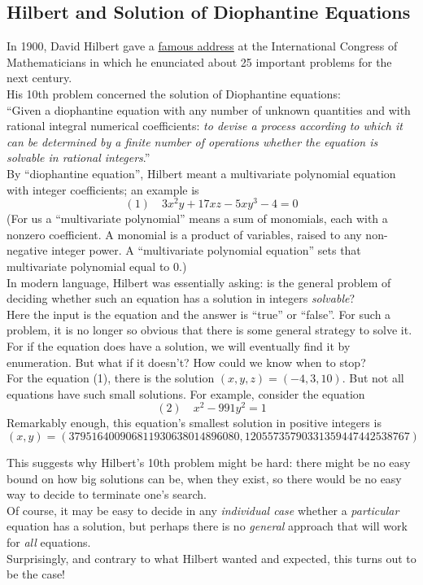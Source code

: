 \documentclass[12pt]{article}
\theoremstyle{plain}
\theoremstyle{definition}
\begin{document}
\subsection{Hilbert and Solution of Diophantine Equations}
In 1900, David Hilbert gave a \href{http://aleph0.clarku.edu/~djoyce/hilbert/problems.html}{famous address} at the International Congress of Mathematicians in which he enunciated about 25 important problems for the next century. \\

His 10th problem concerned the solution of Diophantine equations: \\
``Given a diophantine equation with any number of unknown quantities and with rational integral numerical coefficients: \emph{to devise a process according to which it can be determined by a finite number of operations whether the equation is solvable in rational integers}.'' \\

By ``diophantine equation'', Hilbert meant a multivariate polynomial equation with integer coefficients;
an example is
$$(1)\quad 3x^{2}y + 17xz - 5xy^{3} - 4 = 0$$
(For us a ``multivariate polynomial'' means a sum of monomials, each with a nonzero coefficient. A monomial is a product of variables, raised to any non-negative integer power. A ``multivariate polynomial equation'' sets that multivariate polynomial equal to 0.) \\

In modern language, Hilbert was essentially asking: is the general problem of deciding whether such an equation has a solution in integers \emph{solvable}? \\
Here the input is the equation and the answer is ``true'' or ``false''.
For such a problem, it is no longer so obvious that there is some general strategy to solve it.
For if the equation does have a solution, we will eventually find it by enumeration.
But what if it doesn't?
How could we know when to stop? \\

For the equation (1), there is the solution $(x,y,z) = (-4, 3, 10)$.
But not all equations have such small solutions.
For example, consider the equation
$$(2)\quad x^{2} -991y^{2} = 1$$
Remarkably enough, this equation's smallest solution in positive integers is
$$(x,y) = (379516400906811930638014896080, 12055735790331359447442538767)$$

This suggests why Hilbert's 10th problem might be hard: there might be no easy bound on how big solutions can be, when they exist, so there would be no easy way to decide to terminate one's search. \\
Of course, it may be easy to decide in any \emph{individual case} whether a \emph{particular} equation has a solution, but perhaps there is no \emph{general} approach that will work for \emph{all} equations. \\
Surprisingly, and contrary to what Hilbert wanted and expected, this turns out to be the case!
\end{document}
